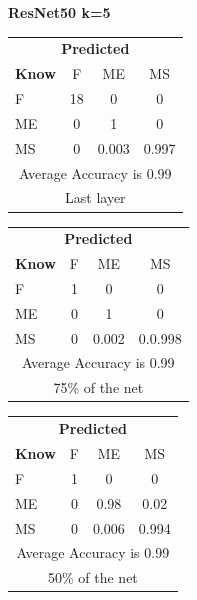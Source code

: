\documentclass[12pt]{article} %
\begin{document}
\begin{center}
\textbf{ResNet50 k=5}
\end{center}
\begin{minipage}{0.5\textwidth}
\begin{center}
\begin{tabular}{l|c|c|c|}
 \multicolumn{4}{c}{ \textbf{ Predicted}}\\
 \textbf{Know}&F&ME&MS\\ \hline\hline
F   &18&0&0\\
ME &0&1&0\\
MS &0&0.003&0.997\\
\multicolumn{4}{c}{Average Accuracy is 0.99}\\
\multicolumn{4}{c}{Last layer}\\
\end{tabular}
\end{center}
\end{minipage}
\begin{minipage}{0.5\textwidth}
\begin{center}
\begin{tabular}{l|c|c|c|}
 \multicolumn{4}{c}{ \textbf{ Predicted}}\\
 \textbf{Know}&F&ME&MS\\ \hline\hline
F   &1&0&0\\
ME &0&1&0\\
MS &0&0.002&0.0.998\\
\multicolumn{4}{c}{Average Accuracy is 0.99}\\
\multicolumn{4}{c}{75\%  of the net}\\
\end{tabular}
\end{center}
\end{minipage}
\begin{minipage}{0.5\textwidth}
\begin{center}
\begin{tabular}{l|c|c|c|}
 \multicolumn{4}{c}{ \textbf{ Predicted}}\\
 \textbf{Know}&F&ME&MS\\ \hline\hline
F   &1&0&0\\
ME &0&0.98&0.02\\
MS &0&0.006&0.994\\
\multicolumn{4}{c}{Average Accuracy is 0.99}\\
\multicolumn{4}{c}{50\%  of the net}\\
\end{tabular}
\end{center}
\end{minipage}
\end{document}
